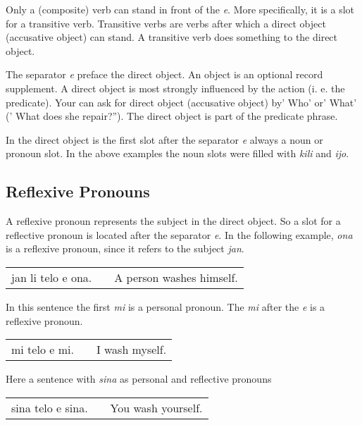 Only a (composite) verb can stand in front of the \textit{e}. 
More specifically, it is a slot for a transitive verb. 
Transitive verbs are verbs after which a direct object (accusative object) can stand. 
A transitive verb does something to the direct object. 

The separator \textit{e} preface the direct object.
An object is an optional record supplement. 
A direct object is most strongly influenced by the action (i. e. the predicate).
Your can ask for direct object (accusative object) by' Who' or' What' (' What does she repair?'').
The direct object is part of the predicate phrase. 

In the direct object is the first slot after the separator \textit{e} always a noun or pronoun slot.
In the above examples the noun slots were filled with \textit{kili} and \textit{ijo}. 

%
\subsection*{Reflexive Pronouns}
%

A reflexive pronoun represents the subject in the direct object. 
So a slot for a reflective pronoun is located after the separator \textit{e}. 
In the following example, \textit{ona} is a reflexive pronoun, since it refers to the subject \textit{jan}. 

\begin{supertabular}{p{5,5cm}|ll}
jan li telo e ona. && A person washes himself. \\
\end{supertabular}

In this sentence the first \textit{mi} is a personal pronoun.
The \textit{mi} after the \textit{e} is a reflexive pronoun. 

\begin{supertabular}{p{5,5cm}|ll}
mi telo e mi. && I wash myself. \\
\end{supertabular}

Here a sentence with \textit{sina} as personal and reflective pronouns

\begin{supertabular}{p{5,5cm}|ll}
sina telo e sina. && You wash yourself. \\
\end{supertabular}

